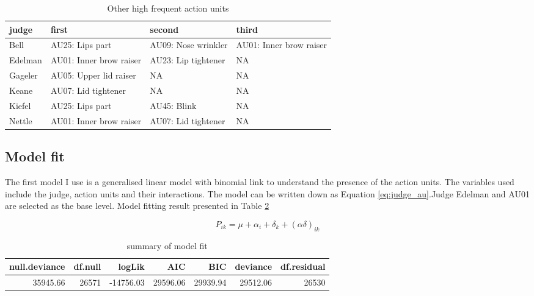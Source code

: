 \documentclass{monashthesis}
\begin{document}
\begin{table}[t]

\caption{\label{tab:unnamed-chunk-7}\label{tab:other_highf} Other high frequent action units }
\centering
\begin{tabular}{l|l|l|l}
\hline
judge & first & second & third\\
\hline
Bell & AU25: Lips part & AU09: Nose wrinkler & AU01: Inner brow raiser\\
\hline
Edelman & AU01: Inner brow raiser & AU23: Lip tightener & NA\\
\hline
Gageler & AU05: Upper lid raiser & NA & NA\\
\hline
Keane & AU07: Lid tightener & NA & NA\\
\hline
Kiefel & AU25: Lips part & AU45: Blink & NA\\
\hline
Nettle & AU01: Inner brow raiser & AU07: Lid tightener & NA\\
\hline
\end{tabular}
\end{table}

\hypertarget{model-fit}{%
\subsection{Model fit}\label{model-fit}}

The first model I use is a generalised linear model with binomial link to understand the presence of the action units. The variables used include the judge, action units and their interactions. The model can be written down as Equation \ref{eq:judge_au}.Judge Edelman and AU01 are selected as the base level. Model fitting result presented in Table \ref{tab:glance_1}

\begin{equation}\label{eq:judge_au}
P_{ik} = \mu + \alpha_i + \delta_k + (\alpha\delta)_{ik}
\end{equation}

\begin{table}[t]

\caption{\label{tab:unnamed-chunk-8}\label{tab:glance_1}summary of model fit}
\centering
\begin{tabular}{r|r|r|r|r|r|r}
\hline
null.deviance & df.null & logLik & AIC & BIC & deviance & df.residual\\
\hline
35945.66 & 26571 & -14756.03 & 29596.06 & 29939.94 & 29512.06 & 26530\\
\hline
\end{tabular}
\end{table}
\end{document}
